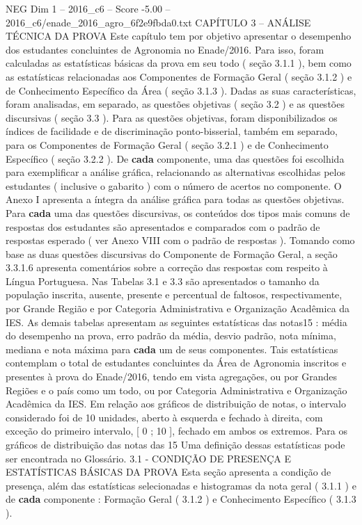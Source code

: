 \begin{textsample}{NEG Dim 1 – 2016\_c6 – Score -5.00 – 2016\_c6/enade\_2016\_agro\_6f2e9fbda0.txt}  \label{ex:f1_neg_048}
CAPÍTULO 3 – ANÁLISE TÉCNICA DA PROVA Este capítulo tem por objetivo apresentar o desempenho dos estudantes concluintes de Agronomia no Enade/2016.
Para isso, foram calculadas as estatísticas básicas da prova em seu todo ( seção 3.1.1 ), bem como as estatísticas relacionadas aos Componentes de Formação Geral ( seção 3.1.2 ) e de Conhecimento Específico da Área ( seção 3.1.3 ).
Dadas as suas características, foram analisadas, em separado, as questões objetivas ( seção 3.2 ) e as questões discursivas ( seção 3.3 ).
Para as questões objetivas, foram disponibilizados os índices de facilidade e de discriminação ponto-bisserial, também em separado, para os Componentes de Formação Geral ( seção 3.2.1 ) e de Conhecimento Específico ( seção 3.2.2 ).
De \textbf{cada} componente, uma das questões foi escolhida para exemplificar a análise gráfica, relacionando as alternativas escolhidas pelos estudantes ( inclusive o gabarito ) com o número de acertos no componente.
O Anexo I apresenta a íntegra da análise gráfica para todas as questões objetivas.
Para \textbf{cada} uma das questões discursivas, os conteúdos dos tipos mais comuns de respostas dos estudantes são apresentados e comparados com o padrão de respostas esperado ( ver Anexo VIII com o padrão de respostas ).
Tomando como base as duas questões discursivas do Componente de Formação Geral, a seção 3.3.1.6 apresenta comentários sobre a correção das respostas com respeito à Língua Portuguesa.
Nas Tabelas 3.1 e 3.3 são apresentados o tamanho da população inscrita, ausente, presente e percentual de faltosos, respectivamente, por Grande Região e por Categoria Administrativa e Organização Acadêmica da IES.
As demais tabelas apresentam as seguintes estatísticas das notas15 : média do desempenho na prova, erro padrão da média, desvio padrão, nota mínima, mediana e nota máxima para \textbf{cada} um de seus componentes.
Tais estatísticas contemplam o total de estudantes concluintes da Área de Agronomia inscritos e presentes à prova do Enade/2016, tendo em vista agregações, ou por Grandes Regiões e o país como um todo, ou por Categoria Administrativa e Organização Acadêmica da IES.
Em relação aos gráficos de distribuição de notas, o intervalo considerado foi de 10 unidades, aberto à esquerda e fechado à direita, com exceção do primeiro intervalo, [ 0 ; 10 ], fechado em ambos os extremos.
Para os gráficos de distribuição das notas das 15 Uma definição dessas estatísticas pode ser encontrada no Glossário. 3.1 - CONDIÇÃO DE PRESENÇA E ESTATÍSTICAS BÁSICAS DA PROVA Esta seção apresenta a condição de presença, além das estatísticas selecionadas e histogramas da nota geral ( 3.1.1 ) e de \textbf{cada} componente : Formação Geral ( 3.1.2 ) e Conhecimento Específico ( 3.1.3 ).

\end{textsample}

